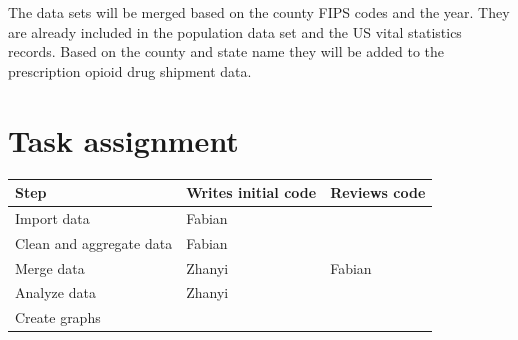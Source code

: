\documentclass[12pt]{article}
\begin{document}
The data sets will be merged based on the county FIPS codes and the year. They are already included in the population data set and the US vital statistics records. Based on the county and state name they will be added to the prescription opioid drug shipment data.
\vspace*{1cm}


\section{Task assignment}

\begin{center}
\begin{tabular}{ l | l l}
\textbf{Step}  & \textbf{Writes initial code} & \textbf{Reviews code}\\ \hline
 Import data & Fabian & \\  
 Clean and aggregate data & Fabian & \\
 Merge data & Zhanyi & Fabian \\
 Analyze data & Zhanyi & \\
 Create graphs & & \\
\end{tabular}
\end{center}
\end{document}
